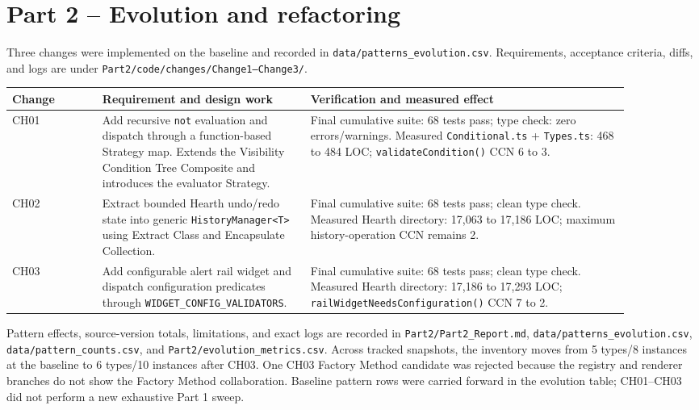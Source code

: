 \documentclass[11pt,a4paper]{article}
\newcommand{\code}[1]{\texttt{\small #1}}
\begin{document}
\section{Part 2 -- Evolution and refactoring}
Three changes were implemented on the baseline and recorded in
\code{data/patterns\_evolution.csv}. Requirements, acceptance criteria, diffs,
and logs are under \code{Part2/code/changes/Change1--Change3/}.

\begin{longtable}{p{0.13\linewidth}p{0.30\linewidth}p{0.46\linewidth}}
\toprule
Change & Requirement and design work & Verification and measured effect \\
\midrule
\endhead
CH01 & Add recursive \code{not} evaluation and dispatch through a function-based Strategy map. Extends the Visibility Condition Tree Composite and introduces the evaluator Strategy. & Final cumulative suite: 68 tests pass; type check: zero errors/warnings. Measured \code{Conditional.ts} + \code{Types.ts}: 468 to 484 LOC; \code{validateCondition()} CCN 6 to 3. \\
CH02 & Extract bounded Hearth undo/redo state into generic \code{HistoryManager\textless T\textgreater} using Extract Class and Encapsulate Collection. & Final cumulative suite: 68 tests pass; clean type check. Measured Hearth directory: 17,063 to 17,186 LOC; maximum history-operation CCN remains 2. \\
CH03 & Add configurable alert rail widget and dispatch configuration predicates through \code{WIDGET\_CONFIG\_VALIDATORS}. & Final cumulative suite: 68 tests pass; clean type check. Measured Hearth directory: 17,186 to 17,293 LOC; \code{railWidgetNeedsConfiguration()} CCN 7 to 2. \\
\bottomrule
\end{longtable}

Pattern effects, source-version totals, limitations, and exact logs are recorded
in \code{Part2/Part2\_Report.md}, \code{data/patterns\_evolution.csv},
\code{data/pattern\_counts.csv}, and \code{Part2/evolution\_metrics.csv}.
Across tracked snapshots, the inventory moves from 5 types/8 instances at the
baseline to 6 types/10 instances after CH03. One CH03 Factory Method candidate
was rejected because the registry and renderer branches do not show the
Factory Method collaboration. Baseline pattern rows were carried forward in
the evolution table; CH01--CH03 did not perform a new exhaustive Part 1 sweep.
\end{document}

